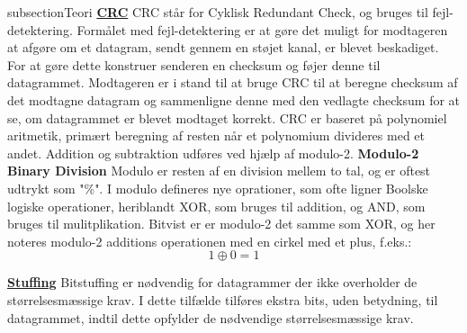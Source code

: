 subsection{Teori}
\underline{\textbf{CRC}}
\newline
CRC står for Cyklisk Redundant Check, og bruges til fejl-detektering.
Formålet med fejl-detektering er at gøre det muligt for modtageren at afgøre om et datagram, sendt gennem en støjet kanal, er blevet beskadiget.
For at gøre dette konstruer senderen en checksum og føjer denne til datagrammet.
Modtageren er i stand til at bruge CRC til at beregne checksum af det modtagne datagram og sammenligne denne med den vedlagte checksum for at se, om datagrammet er blevet modtaget korrekt.\cite{ross}
\newline
CRC er baseret på polynomiel aritmetik, primært beregning af resten når et polynomium divideres med et andet. Addition og subtraktion udføres ved hjælp af modulo-2.  %
\newline
\textbf{Modulo-2 Binary Division}
\newline
Modulo er resten af en division mellem to tal, og er oftest udtrykt som "\%".
\newline
I modulo defineres nye oprationer, som ofte ligner Boolske logiske operationer, heriblandt XOR, som bruges til addition, og AND, som bruges til mulitplikation.
Bitvist er er modulo-2 det samme som XOR, og her noteres modulo-2 additions operationen med en cirkel med et plus, f.eks.: 
$$1 \oplus 0 = 1$$

\hfill \break
\underline{\textbf{Stuffing}}
\newline
Bitstuffing er nødvendig for datagrammer der ikke overholder de størrelsesmæssige krav. I dette tilfælde tilføres ekstra bits, uden betydning, til datagrammet, indtil dette opfylder de nødvendige størrelsesmæssige krav.